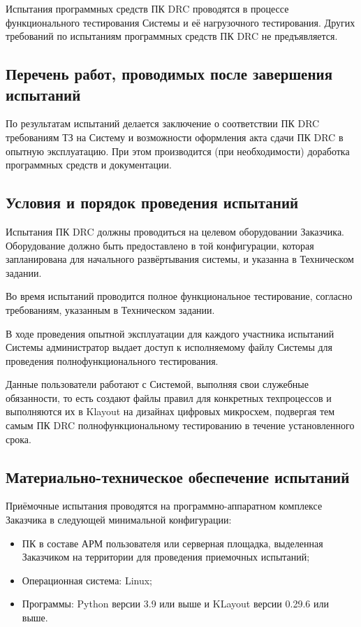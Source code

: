 Испытания программных средств ПК DRC проводятся
в процессе функционального тестирования Системы
и её нагрузочного тестирования.
Других требований по испытаниям программных средств ПК DRC не предъявляется.

\subsection{Перечень работ, проводимых после завершения испытаний}

По результатам испытаний делается заключение
о соответствии ПК DRC требованиям ТЗ на Систему
и возможности оформления акта сдачи ПК DRC в опытную эксплуатацию.
При этом производится (при необходимости) доработка программных средств
и документации.

\subsection{Условия и порядок проведения испытаний}

Испытания ПК DRC должны проводиться на целевом оборудовании Заказчика.
Оборудование должно быть предоставлено в той конфигурации,
которая запланирована для начального развёртывания системы,
и указанна в Техническом задании.

Во время испытаний проводится полное функциональное тестирование,
согласно требованиям, указанным в Техническом задании.

В ходе проведения опытной эксплуатации
для каждого участника испытаний
Системы администратор выдает доступ к исполняемому файлу Системы
для проведения полнофункционального тестирования.

Данные пользователи работают с Системой,
выполняя свои служебные обязанности,
то есть создают файлы правил для конкретных техпроцессов и выполняются
их в Klayout на дизайнах цифровых микросхем,
подвергая тем самым ПК DRC полнофункциональному тестированию
в течение установленного срока.

\subsection{Материально-техническое обеспечение испытаний}

Приёмочные испытания проводятся
на программно-аппаратном комплексе Заказчика
в следующей минимальной конфигурации:

\begin{itemize}
	\item ПК в составе АРМ пользователя
		или серверная площадка, выделенная Заказчиком на территории
		для проведения приемочных испытаний;
	\item Операционная система: Linux;
	\item Программы: Python версии 3.9 или выше
		и KLayout версии 0.29.6 или выше.
\end{itemize}

